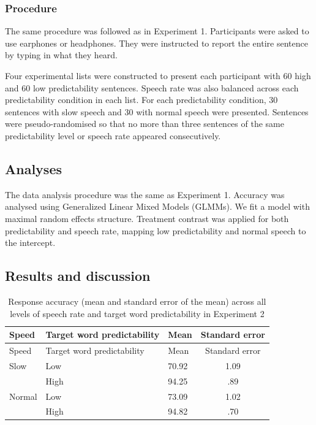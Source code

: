 \documentclass[a4paper, nobind]{templates/ociamthesis}
\begin{document}
\hypertarget{procedure-4}{%
\subsubsection{Procedure}\label{procedure-4}}

The same procedure was followed as in Experiment 1.
Participants were asked to use earphones or headphones.
They were instructed to report the entire sentence by typing in what they heard.

Four experimental lists were constructed to present each participant with 60 high and 60 low predictability sentences.
Speech rate was also balanced across each predictability condition in each list. For each predictability condition, 30 sentences with slow speech and 30 with normal speech were presented.
Sentences were pseudo-randomised so that no more than three sentences of the same predictability level or speech rate appeared consecutively.

\hypertarget{analyses-4}{%
\subsection{Analyses}\label{analyses-4}}

The data analysis procedure was the same as Experiment 1.
Accuracy was analysed using Generalized Linear Mixed Models (GLMMs).
We fit a model with maximal random effects structure.
Treatment contrast was applied for both predictability and speech rate, mapping low predictability and normal speech to the intercept.

\hypertarget{results-and-discussion-4}{%
\subsection{Results and discussion}\label{results-and-discussion-4}}

\begin{longtable}[]{@{}lllc@{}}
\caption{Response accuracy (mean and standard error of the mean) across all levels of speech rate and target word predictability in Experiment 2}
\label{summary3b}
\tabularnewline
\toprule
Speed & Target word predictability & Mean & Standard
error \\
\midrule
\endfirsthead
\toprule
Speed & Target word predictability & Mean & Standard
error \\
\midrule
\endhead
Slow & Low & 70.92 & 1.09 \\
& High & 94.25 & .89 \\
Normal & Low & 73.09 & 1.02 \\
& High & 94.82 & .70 \\
\bottomrule
\end{longtable}
\end{document}
